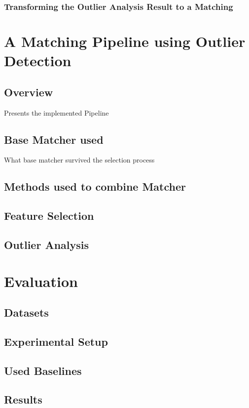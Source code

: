 \documentclass[11pt,titlepage,oneside,openany,a4paper]{report}
\begin{document}
\subsection{Transforming the Outlier Analysis Result to a Matching}


\chapter{A Matching Pipeline using Outlier Detection}

\section{Overview}
Presents the implemented Pipeline
\section{Base Matcher used}
What base matcher survived the selection process
\section{Methods used to combine Matcher}

\section{Feature Selection}

\section{Outlier Analysis}



\chapter{Evaluation}
\section{Datasets}
\section{Experimental Setup}
\section{Used Baselines}
\section{Results}
\end{document}
